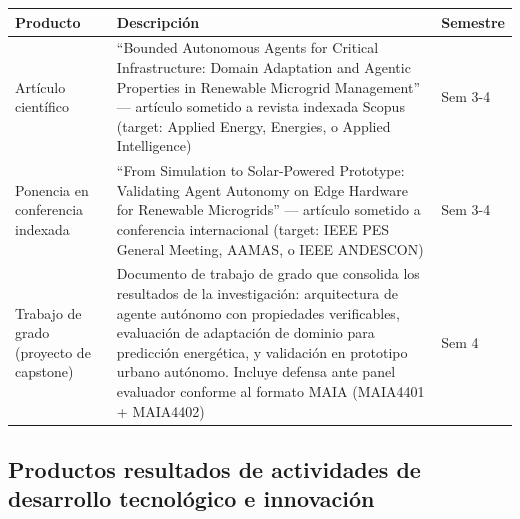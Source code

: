 \documentclass[12pt,letterpaper]{article}
\begin{document}
\begin{longtable}{>{\raggedright\arraybackslash}p{3.5cm} >{\raggedright\arraybackslash}p{9cm} >{\centering\arraybackslash}p{2cm}}
\toprule
\textbf{Producto} & \textbf{Descripci\'on} & \textbf{Semestre} \\
\midrule
\endhead
Art\'iculo cient\'ifico & ``Bounded Autonomous Agents for Critical Infrastructure: Domain Adaptation and Agentic Properties in Renewable Microgrid Management'' --- art\'iculo sometido a revista indexada Scopus (target: Applied Energy, Energies, o Applied Intelligence) & Sem 3-4 \\
\midrule
Ponencia en conferencia indexada & ``From Simulation to Solar-Powered Prototype: Validating Agent Autonomy on Edge Hardware for Renewable Microgrids'' --- art\'iculo sometido a conferencia internacional (target: IEEE PES General Meeting, AAMAS, o IEEE ANDESCON) & Sem 3-4 \\
\midrule
Trabajo de grado (proyecto de capstone) & Documento de trabajo de grado que consolida los resultados de la investigaci\'on: arquitectura de agente aut\'onomo con propiedades verificables, evaluaci\'on de adaptaci\'on de dominio para predicci\'on energ\'etica, y validaci\'on en prototipo urbano aut\'onomo. Incluye defensa ante panel evaluador conforme al formato MAIA (MAIA4401 + MAIA4402) & Sem 4 \\
\bottomrule
\end{longtable}

\subsection{Productos resultados de actividades de desarrollo tecnol\'ogico e innovaci\'on}
\end{document}

